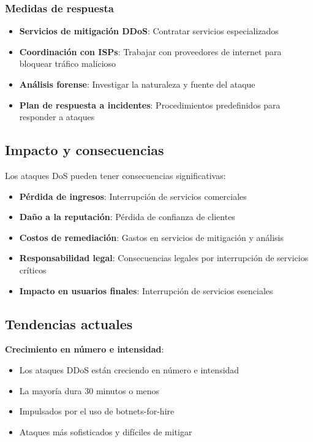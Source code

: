 \subsubsection{Medidas de respuesta}

\begin{itemize}
    \item \textbf{Servicios de mitigación DDoS}: Contratar servicios especializados
    \item \textbf{Coordinación con ISPs}: Trabajar con proveedores de internet para bloquear tráfico malicioso
    \item \textbf{Análisis forense}: Investigar la naturaleza y fuente del ataque
    \item \textbf{Plan de respuesta a incidentes}: Procedimientos predefinidos para responder a ataques
\end{itemize}

\subsection{Impacto y consecuencias}

Los ataques DoS pueden tener consecuencias significativas:

\begin{itemize}
    \item \textbf{Pérdida de ingresos}: Interrupción de servicios comerciales
    \item \textbf{Daño a la reputación}: Pérdida de confianza de clientes
    \item \textbf{Costos de remediación}: Gastos en servicios de mitigación y análisis
    \item \textbf{Responsabilidad legal}: Consecuencias legales por interrupción de servicios críticos
    \item \textbf{Impacto en usuarios finales}: Interrupción de servicios esenciales
\end{itemize}

\subsection{Tendencias actuales}

\textbf{Crecimiento en número e intensidad}:
\begin{itemize}
    \item Los ataques DDoS están creciendo en número e intensidad
    \item La mayoría dura 30 minutos o menos
    \item Impulsados por el uso de botnets-for-hire
    \item Ataques más sofisticados y difíciles de mitigar
\end{itemize}

